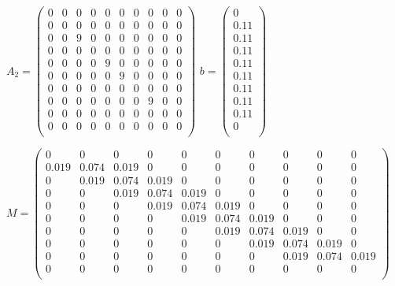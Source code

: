 \documentclass[12pt]{article}
\begin{document}
\begin{center}

$
A_2 = \begin{pmatrix}
0 & 0 & 0 & 0 & 0 & 0 & 0 & 0 & 0 & 0  \\
0 & 0 & 0 & 0 & 0 & 0 & 0 & 0 & 0 & 0  \\
0 & 0 & 9 & 0 & 0 & 0 & 0 & 0 & 0 & 0  \\
0 & 0 & 0 & 0 & 0 & 0 & 0 & 0 & 0 & 0  \\
0 & 0 & 0 & 0 & 9 & 0 & 0 & 0 & 0 & 0  \\
0 & 0 & 0 & 0 & 0 & 9 & 0 & 0 & 0 & 0  \\
0 & 0 & 0 & 0 & 0 & 0 & 0 & 0 & 0 & 0  \\
0 & 0 & 0 & 0 & 0 & 0 & 0 & 9 & 0 & 0  \\
0 & 0 & 0 & 0 & 0 & 0 & 0 & 0 & 0 & 0  \\
0 & 0 & 0 & 0 & 0 & 0 & 0 & 0 & 0 & 0  \\
\end{pmatrix}
$
$
b = \begin{pmatrix}
0 \\
0.11 \\
0.11 \\
0.11 \\
0.11 \\
0.11 \\
0.11 \\
0.11 \\
0.11 \\
0 \\
\end{pmatrix}
$
\end{center}

\begin{center}
$
M = \begin{pmatrix}
0 & 0 & 0 & 0 & 0 & 0 & 0 & 0 & 0 & 0  \\
0.019 & 0.074 & 0.019 & 0 & 0 & 0 & 0 & 0 & 0 & 0  \\
0 & 0.019 & 0.074 & 0.019  & 0 & 0 & 0 & 0 & 0 & 0  \\
0 & 0 & 0.019 & 0.074 & 0.019  & 0 & 0 & 0 & 0 & 0  \\
0 & 0 & 0 & 0.019 & 0.074 & 0.019  & 0 & 0 & 0 & 0  \\
0 & 0 & 0 & 0 & 0.019 & 0.074 & 0.019  & 0 & 0 & 0  \\
0 & 0 & 0 & 0 & 0 & 0.019 & 0.074 & 0.019  & 0 & 0  \\
0 & 0 & 0 & 0 & 0 & 0 & 0.019 & 0.074 & 0.019  & 0  \\
0 & 0 & 0 & 0 & 0 & 0 & 0 & 0.019 & 0.074 & 0.019   \\
0 & 0 & 0 & 0 & 0 & 0 & 0 & 0 & 0 & 0  \\
\end{pmatrix} 
$
\end{center}
\end{document}
